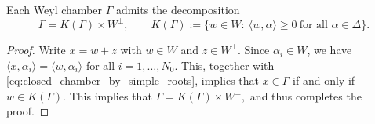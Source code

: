 \documentclass[12pt]{amsart}
\begin{document}
\begin{lemma}\label{chambergeometry}
Each Weyl chamber $\Gamma$ admits the decomposition
\[
\Gamma = K(\Gamma)\times W^\perp,
\qquad
K(\Gamma):=\{w\in W:\ \langle w,\alpha\rangle\ge 0\ \text{for all }\alpha\in\Delta\}.
\]
\end{lemma}

\begin{proof}
Write $x=w+z$ with $w\in W$ and $z\in W^{\perp}$. Since $\alpha_{i}\in W$, we have $\langle x,\alpha_{i}\rangle=\langle w,\alpha_{i}\rangle$ for all
$i=1,\ldots,N_0$. This, together with \eqref{eq:closed_chamber_by_simple_roots}, implies that $x\in \Gamma$ if and only if
$
w\in K(\Gamma).
$
This implies that
$
\Gamma
=
K(\Gamma)\times W^{\perp},
$
and thus completes the proof.
\end{proof}

%
%
%
\end{document}
